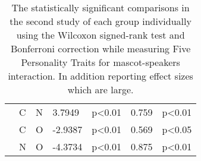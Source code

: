 \begin{table}
\begin{center}
\begin{tabular}{ |p{2.5cm}| p{0.5cm}|p{0.5cm}|p{1.3cm}| p{1.7cm}|p{1cm}|p{1.7cm}|  }
            &C &N &3.7949 &p<0.01 & 0.759 &p<0.01\\
            &C &O &-2.9387 &p<0.01 & 0.569 &p<0.05\\
            &N &O &-4.3734 &p<0.01 & 0.875 &p<0.01\\
            \hline
        \end{tabular}
    \end{center}
    \captionsetup{width=13.5cm}
    \caption{The statistically significant comparisons in the second study of each group individually using the Wilcoxon
    signed-rank test and Bonferroni correction while measuring Five Personality Traits for mascot-speakers interaction.
    In addition reporting effect sizes which are large.}
    \label{table:wilcoxMS2}
\end{table}
\pagebreak
